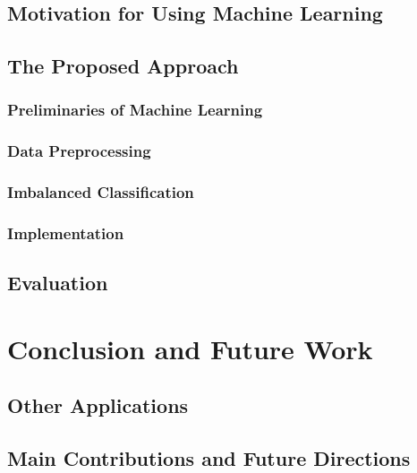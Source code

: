 \documentclass[12pt]{report}	%
\begin{document}
\section{Motivation for Using Machine Learning}
\label{sec:solution:motivation}

\section{The Proposed Approach}
\label{sec:solution:approach}

\subsection{Preliminaries of Machine Learning}

\subsection{Data Preprocessing}

\subsection{Imbalanced Classification}

\subsection{Implementation}

\section{Evaluation}
\label{sec:solution:eval}


\chapter{Conclusion and Future Work}
\label{sec:conclusion}

\section{Other Applications}
\label{sec:conclusion:other}

\section{Main Contributions and Future Directions}
\label{sec:conclusion:close}

%	
\end{document}
